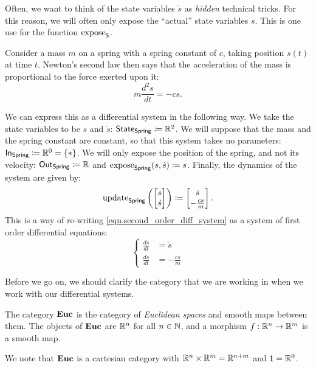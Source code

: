 \documentclass[DynamicalBook]{subfiles}
\begin{document}
  Often, we want to think of the state variables $\dot{s}$ as \emph{hidden}
  technical tricks. For this reason, we will often only expose the ``actual''
  state variables $s$. This is one use for the function $\mathrm{expose}_{\mathsf{S}}$.

  \begin{example}\label{ex.second_order_diff_system}
Consider a mass $m$ on a spring with a spring constant of $c$, taking position $s(t)$ at time $t$. Newton's
second law then says that the acceleration of the mass is proportional to the
force exerted upon it:
\begin{equation}\label{eqn.second_order_diff_system}
m \frac{d^2 s}{dt} = -cs.
\end{equation}

We can express this as a differential system in the following way. We take the
state variables to be $s$ and $\dot{s}$: $\mathsf{State}_{\mathsf{Spring}} \coloneqq \mathbb{R}^2$. We
will suppose that the mass and the spring constant are constant, so that this
system takes no parameters: $\mathsf{In}_{\mathsf{Spring}} \coloneqq \mathbb{R}^0 = \{\ast\}$. We will
only expose the position of the spring, and not its velocity: $\mathsf{Out}_{\mathsf{Spring}}
\coloneqq \mathbb{R}$ and $\mathrm{expose}_{\mathsf{Spring}}(s, \dot{s}) \coloneqq s$. Finally, the
dynamics of the system are given by:
\[
\mathrm{update}_{\mathsf{Spring}}\left(\begin{bmatrix}s \\ \dot{s} \end{bmatrix}  \right)
\coloneqq \begin{bmatrix} \dot{s} \\ -\frac{cs}{m}\end{bmatrix}.
\]
This is a way of re-writing \cref{eqn.second_order_diff_system} as a system of
first order differential equations:
\[
  \begin{cases} \frac{ds}{dt} &= \dot{s} \\
   \frac{d\dot{s}}{dt} &= -\frac{cs}{m}\end{cases}
\]
  \end{example}

Before we go on, we should clarify the category that we are working in when we
work with our
differential systems.
\begin{definition}\label{def.euc_cat}
The category $\textbf{Euc}$ is the category of \emph{Euclidean spaces} and smooth
maps between them. The objects of $\textbf{Euc}$ are $\mathbb{R}^n$ for all $n \in \mathbb{N}$,
and a morphism $f : \mathbb{R}^n \to \mathbb{R}^m$ is a smooth map.

We note that $\textbf{Euc}$ is a cartesian category with $\mathbb{R}^n \times \mathbb{R}^m =
\mathbb{R}^{n + m}$ and $\mathsf{1} = \mathbb{R}^0$.
\end{definition}
\end{document}
